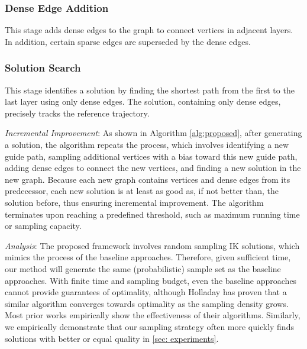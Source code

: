 \subsubsection{Dense Edge Addition}
This stage adds dense edges to the graph to connect vertices in adjacent layers. In addition, certain sparse edges are superseded by the dense edges. 

\subsubsection{Solution Search} 
This stage identifies a solution by finding the shortest path from the first to the last layer using only dense edges. The solution, containing only dense edges, precisely tracks the reference trajectory.


\textit{Incremental Improvement}:
As shown in Algorithm \ref{alg:proposed}, after generating a solution, the algorithm repeats the process, which involves identifying a new guide path, sampling additional vertices with a bias toward this new guide path, adding dense edges to connect the new vertices, and finding a new solution in the new graph. Because each new graph contains vertices and dense edges from its predecessor, each new solution is at least as good as, if not better than, the solution before, thus ensuring incremental improvement. The algorithm terminates upon reaching a predefined threshold, such as maximum running time or sampling capacity.

\textit{Analysis}:
The proposed framework involves random sampling IK solutions, which mimics the process of the baseline approaches. Therefore, given sufficient time, our method will generate the same (probabilistic) sample set as the baseline approaches.
With finite time and sampling budget, even the baseline approaches cannot provide guarantees of optimality, although Holladay \cite{holladay2019minimizing} has proven that a similar algorithm converges towards optimality as the sampling density grows.
Most prior works \cite{rakita2019stampede,wang2024iklink,morgan2024cppflow} empirically show the effectiveness of their algorithms. Similarly, we empirically demonstrate that our sampling strategy often more quickly finds solutions with better or equal quality in \cref{sec: experiments}.


